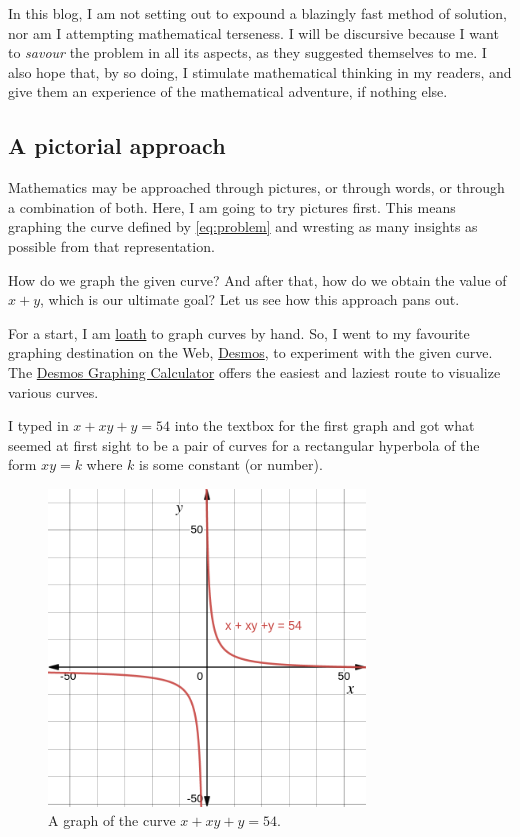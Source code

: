 \documentclass[
  a4paper,
]{article}
\begin{document}
In this blog, I am not setting out to expound a blazingly fast method of
solution, nor am I attempting mathematical terseness. I will be
discursive because I want to \emph{savour} the problem in all its
aspects, as they suggested themselves to me. I also hope that, by so
doing, I stimulate mathematical thinking in my readers, and give them an
experience of the mathematical adventure, if nothing else.

\hypertarget{a-pictorial-approach}{%
\subsection{A pictorial approach}\label{a-pictorial-approach}}

Mathematics may be approached through pictures, or through words, or
through a combination of both. Here, I am going to try pictures first.
This means graphing the curve defined by \cref{eq:problem} and wresting
as many insights as possible from that representation.

How do we graph the given curve? And after that, how do we obtain the
value of \(x + y\), which is our ultimate goal? Let us see how this
approach pans out.

For a start, I am \href{https://www.thefreedictionary.com/loath}{loath}
to graph curves by hand. So, I went to my favourite graphing destination
on the Web, \href{https://www.desmos.com}{Desmos}, to experiment with
the given curve. The \href{https://www.desmos.com/calculator}{Desmos
Graphing Calculator} offers the easiest and laziest route to visualize
various curves.

I typed in
\href{https://www.desmos.com/calculator/nwkikstcm6}{\(x + xy + y = 54\)}
into the textbox for the first graph and got what seemed at first sight
to be a pair of curves for a rectangular hyperbola of the form
\(xy = k\) where \(k\) is some constant (or number).

\begin{figure}
\hypertarget{fig:one}{%
\centering
\includegraphics[width=0.75\textwidth,height=\textheight]{images/olympiad-one.png}
\caption{A graph of the curve \(x + xy + y = 54\).}\label{fig:one}
}
\end{figure}
\end{document}
